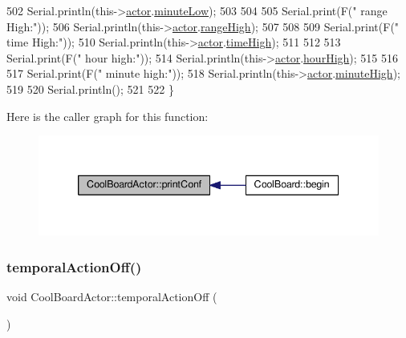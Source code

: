 \begin{DoxyCode}
502     Serial.println(this->\hyperlink{class_cool_board_actor_a8f190db9f7a39fddbcef7f152da970e9}{actor}.\hyperlink{struct_cool_board_actor_1_1state_acbcc2902331fd9d757cd475eb403bdd9}{minuteLow});
503 
504 
505     Serial.print(F(\textcolor{stringliteral}{" range High:"}));
506     Serial.println(this->\hyperlink{class_cool_board_actor_a8f190db9f7a39fddbcef7f152da970e9}{actor}.\hyperlink{struct_cool_board_actor_1_1state_a6e5cd6c5cd44e2decfd8d4df1853f8e3}{rangeHigh});
507 
508 
509     Serial.print(F(\textcolor{stringliteral}{" time High:"}));
510     Serial.println(this->\hyperlink{class_cool_board_actor_a8f190db9f7a39fddbcef7f152da970e9}{actor}.\hyperlink{struct_cool_board_actor_1_1state_a54cd4976b56aeaa6274fe0576aaebb0f}{timeHigh});
511 
512 
513     Serial.print(F(\textcolor{stringliteral}{" hour high:"}));
514     Serial.println(this->\hyperlink{class_cool_board_actor_a8f190db9f7a39fddbcef7f152da970e9}{actor}.\hyperlink{struct_cool_board_actor_1_1state_acd1af3ac2382258a5b05497d814adc01}{hourHigh});
515 
516 
517     Serial.print(F(\textcolor{stringliteral}{" minute high:"}));
518     Serial.println(this->\hyperlink{class_cool_board_actor_a8f190db9f7a39fddbcef7f152da970e9}{actor}.\hyperlink{struct_cool_board_actor_1_1state_a4bff3d61ead74adb60be224764b93006}{minuteHigh});
519 
520     Serial.println(); 
521 
522 \}
\end{DoxyCode}
Here is the caller graph for this function\+:\nopagebreak
\begin{figure}[H]
\begin{center}
\leavevmode
\includegraphics[width=339pt]{dc/d69/class_cool_board_actor_aabb10e7aebc3249ffc940530de29f84a_icgraph}
\end{center}
\end{figure}
\mbox{\label{class_cool_board_actor_a02698bd647df49cabbe74513d4d88918}} 
\subsubsection{\texorpdfstring{temporal\+Action\+Off()}{temporalActionOff()}}
{\footnotesize\ttfamily void Cool\+Board\+Actor\+::temporal\+Action\+Off (\begin{DoxyParamCaption}{ }\end{DoxyParamCaption})}

